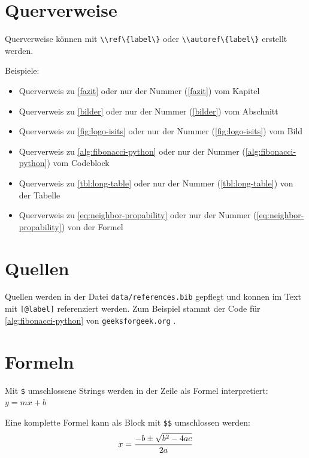 \documentclass[
  11pt,
  a4paper,
  openright,
  cleardoublepage=plain,
  parskip=half+, %
]{scrreprt}
\newcommand{\passthrough}[1]{#1}
\providecommand{\tightlist}{%
  \setlength{\itemsep}{0pt}\setlength{\parskip}{0pt}}
\begin{document}
\section{Querverweise}\label{querverweise}

Querverweise können mit \passthrough{\lstinline!\\ref\{label\}!} oder
\passthrough{\lstinline!\\autoref\{label\}!} erstellt werden.

Beispiele:

\begin{itemize}
\tightlist
\item
  Querverweis zu \autoref{fazit} oder nur der Nummer (\ref{fazit}) vom
  Kapitel
\item
  Querverweis zu \autoref{bilder} oder nur der Nummer (\ref{bilder}) vom
  Abschnitt
\item
  Querverweis zu \autoref{fig:logo-isits} oder nur der Nummer
  (\ref{fig:logo-isits}) vom Bild
\item
  Querverweis zu \autoref{alg:fibonacci-python} oder nur der Nummer
  (\ref{alg:fibonacci-python}) vom Codeblock
\item
  Querverweis zu \autoref{tbl:long-table} oder nur der Nummer
  (\ref{tbl:long-table}) von der Tabelle
\item
  Querverweis zu \autoref{eq:neighbor-propability} oder nur der Nummer
  (\ref{eq:neighbor-propability}) von der Formel
\end{itemize}

\section{Quellen}\label{quellen}

Quellen werden in der Datei
\passthrough{\lstinline!data/references.bib!} gepflegt und konnen im
Text mit \passthrough{\lstinline![@label]!} referenziert werden. Zum
Beispiel stammt der Code für \autoref{alg:fibonacci-python} von
\passthrough{\lstinline!geeksforgeek.org!} \citep{fibonacci-python}.

\section{Formeln}\label{formeln}

Mit \passthrough{\lstinline!$!} umschlossene Strings werden in der Zeile
als Formel interpretiert: \(y = mx +b\)

Eine komplette Formel kann als Block mit \passthrough{\lstinline!$$!}
umschlossen werden: \[
x = {-b \pm \sqrt{b^2-4ac} \over 2a}
\]
\end{document}
